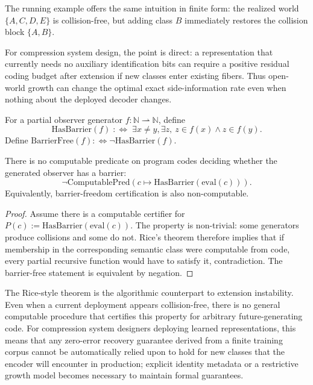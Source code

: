 The running example offers the same intuition in finite form: the realized world $\{A,C,D,E\}$ is collision-free, but adding class $B$ immediately restores the collision block $\{A,B\}$.

For compression system design, the point is direct: a representation that currently needs no auxiliary identification bits can require a positive residual coding budget after extension if new classes enter existing fibers. Thus open-world growth can change the optimal exact side-information rate even when nothing about the deployed decoder changes.

\begin{definition}
For a partial observer generator $f:\mathbb{N}\rightharpoonup\mathbb{N}$, define
\[
\mathrm{HasBarrier}(f)\;:\Leftrightarrow\;\exists x\neq y,\exists z,\ z\in f(x)\land z\in f(y).
\]
Define $\mathrm{BarrierFree}(f):\Leftrightarrow \neg\mathrm{HasBarrier}(f)$.
\end{definition}

\begin{theorem}\label{thm:rice-barrier}
There is no computable predicate on program codes deciding whether the generated observer has a barrier:
\[
\neg\mathrm{ComputablePred}\!\left(c\mapsto \mathrm{HasBarrier}(\mathrm{eval}(c))\right).
\]
Equivalently, barrier-freedom certification is also non-computable.
\end{theorem}

\begin{proof}
Assume there is a computable certifier for $P(c):=\mathrm{HasBarrier}(\mathrm{eval}(c))$. The property is non-trivial: some generators produce collisions and some do not. Rice's theorem therefore implies that if membership in the corresponding semantic class were computable from code, every partial recursive function would have to satisfy it, contradiction. The barrier-free statement is equivalent by negation.
\end{proof}

\begin{remark}
The Rice-style theorem is the algorithmic counterpart to extension instability. Even when a current deployment appears collision-free, there is no general computable procedure that certifies this property for arbitrary future-generating code. For compression system designers deploying learned representations, this means that any zero-error recovery guarantee derived from a finite training corpus cannot be automatically relied upon to hold for new classes that the encoder will encounter in production; explicit identity metadata or a restrictive growth model becomes necessary to maintain formal guarantees.
\end{remark}

